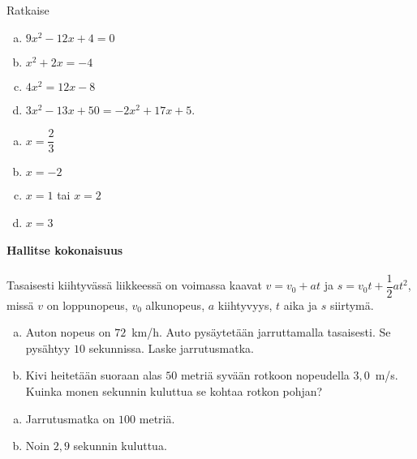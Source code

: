 \begin{tehtavasivu}
\begin{tehtava}
    Ratkaise
    \begin{enumerate}[a)]
        \item $9x^2 - 12x + 4 = 0$
        \item $x^2 + 2x = -4$
        \item $4x^2 = 12x - 8$
        \item $3x^2 - 13x + 50 = -2x^2 + 17x + 5$.
    \end{enumerate}
    \begin{vastaus}
        \begin{enumerate}[a)]
            \item $x = \dfrac{2}{3}$
            \item $x = -2$
            \item $x = 1$ tai $x = 2$
            \item $x = 3$
        \end{enumerate}
    \end{vastaus}
\end{tehtava}

\paragraph*{Hallitse kokonaisuus}

\begin{tehtava}
    Tasaisesti kiihtyvässä liikkeessä on voimassa kaavat $v = v_0 + at$ ja $s = v_0t + \dfrac{1}{2}at^2$, missä $v$ on loppunopeus, $v_0$ alkunopeus, $a$ kiihtyvyys, $t$ aika ja $s$ siirtymä.
		\begin{enumerate}[a)]
            \item Auton nopeus on $72$~km/h. Auto pysäytetään jarruttamalla tasaisesti. Se pysähtyy $10$ sekunnissa. Laske jarrutusmatka.
            \item Kivi heitetään suoraan alas $50$ metriä syvään rotkoon nopeudella $3,0$~m/s. Kuinka monen sekunnin kuluttua se kohtaa rotkon pohjan?
        \end{enumerate}
    \begin{vastaus}
        \begin{enumerate}[a)]
            \item Jarrutusmatka on $100$ metriä.
            \item Noin $2,9$ sekunnin kuluttua.
        \end{enumerate}
    \end{vastaus}
\end{tehtava}


\end{tehtavasivu}
